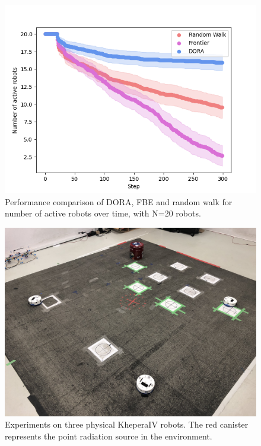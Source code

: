 \begin{figure}[htbp]
	\centering
    \includegraphics[width=0.53\columnwidth]{images/activerobots_20.png}
    \caption{Performance comparison of DORA, FBE and random walk for number of active robots over time, with N=20 robots.}
    \label{results:failures20}
\end{figure}

\label{annexe: physical}
\begin{figure}[htbp]
    \centering
    \captionsetup{belowskip=-20pt}
    \includegraphics[width=0.99\columnwidth]{images/arena.jpeg}
    \caption{Experiments on three physical KheperaIV robots. The red canister represents the point radiation source in the environment.}
    \label{arena}
\end{figure}